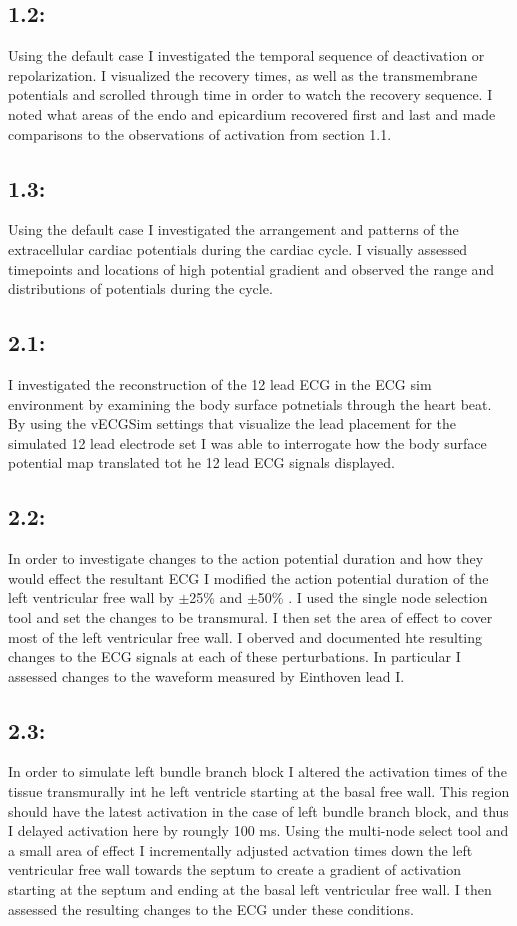\documentclass[12pt]{article}
\begin{document}
\subsection{1.2: }
Using the default case I investigated the temporal sequence of deactivation or repolarization. I visualized the recovery times, as well as the transmembrane potentials and scrolled through time in order to watch the recovery sequence. I noted what areas of the endo and epicardium recovered first and last and made comparisons to the observations of activation from section 1.1.
\subsection{1.3: }
Using the default case I investigated the arrangement and patterns of the extracellular cardiac potentials during the cardiac cycle. I visually assessed timepoints and locations of high potential gradient and observed the range and distributions of potentials during the cycle.

\subsection{2.1: }
I investigated the reconstruction of the 12 lead ECG in the ECG sim environment by examining the body surface potnetials through the heart beat. By using the vECGSim settings that visualize the lead placement for the simulated 12 lead electrode set I was able to interrogate how the body surface potential map translated tot he 12 lead ECG signals displayed.

\subsection{2.2: }
 In order to investigate changes to the action potential duration and how they would effect the resultant ECG I modified the action potential duration of the left ventricular free wall by $\pm$25\% and $\pm$50\% . I used the single node selection tool and set the changes to be transmural. I then set the area of effect to cover most of the left ventricular free wall. I oberved and documented hte resulting changes to the ECG signals at each of these perturbations. In particular I assessed changes to the waveform measured by Einthoven lead I. 
 
 \subsection{2.3: }
 In order to simulate left bundle branch block I altered the activation times of the tissue transmurally int he left ventricle starting at the basal free wall. This region should have the latest activation in the case of left bundle branch block, and thus I delayed activation here by roungly 100 ms. Using the multi-node select tool and a small area of effect I incrementally adjusted actvation times down the left ventricular free wall towards the septum to create a gradient of activation starting at the septum and ending at the basal left ventricular free wall. I then assessed the resulting changes to the ECG under these conditions.
 
\end{document}
